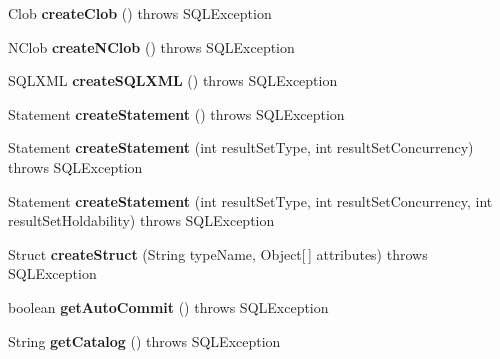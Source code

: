\begin{DoxyCompactItemize}
Clob {\bfseries create\+Clob} ()  throws S\+Q\+L\+Exception 
\item 
\mbox{\label{classsimpledb_1_1jdbc_1_1ConnectionAdapter_aae40f992e6f057278cb4d3a3d3e1f03b}} 
N\+Clob {\bfseries create\+N\+Clob} ()  throws S\+Q\+L\+Exception 
\item 
\mbox{\label{classsimpledb_1_1jdbc_1_1ConnectionAdapter_adb4fcaecc2c308d2f81035994a83b657}} 
S\+Q\+L\+X\+ML {\bfseries create\+S\+Q\+L\+X\+ML} ()  throws S\+Q\+L\+Exception 
\item 
\mbox{\label{classsimpledb_1_1jdbc_1_1ConnectionAdapter_a7d9711f8136fac07aafb641359e08fb5}} 
Statement {\bfseries create\+Statement} ()  throws S\+Q\+L\+Exception 
\item 
\mbox{\label{classsimpledb_1_1jdbc_1_1ConnectionAdapter_a2b9c5de8f9b83d79137867540ffc8d56}} 
Statement {\bfseries create\+Statement} (int result\+Set\+Type, int result\+Set\+Concurrency)  throws S\+Q\+L\+Exception 
\item 
\mbox{\label{classsimpledb_1_1jdbc_1_1ConnectionAdapter_aeeb2c3d08cebd843593b470590929280}} 
Statement {\bfseries create\+Statement} (int result\+Set\+Type, int result\+Set\+Concurrency, int result\+Set\+Holdability)  throws S\+Q\+L\+Exception 
\item 
\mbox{\label{classsimpledb_1_1jdbc_1_1ConnectionAdapter_a2f4c401133b27bbc0e728f65d4c5d3b8}} 
Struct {\bfseries create\+Struct} (String type\+Name, Object\mbox{[}$\,$\mbox{]} attributes)  throws S\+Q\+L\+Exception 
\item 
\mbox{\label{classsimpledb_1_1jdbc_1_1ConnectionAdapter_a37c5f5dc25f6cad73e786d636293ca07}} 
boolean {\bfseries get\+Auto\+Commit} ()  throws S\+Q\+L\+Exception 
\item 
\mbox{\label{classsimpledb_1_1jdbc_1_1ConnectionAdapter_aac24448ea0eb8805c46fece788b1632e}} 
String {\bfseries get\+Catalog} ()  throws S\+Q\+L\+Exception 

\end{DoxyCompactItemize}
